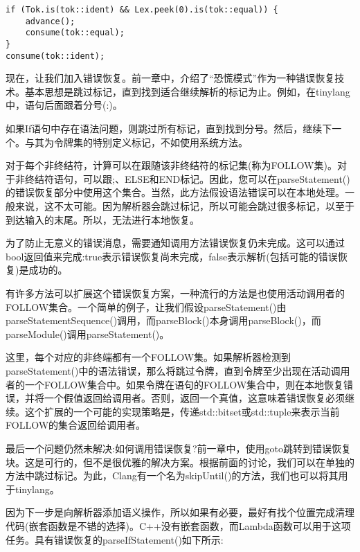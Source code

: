 \begin{lstlisting}[caption={}]
if (Tok.is(tok::ident) && Lex.peek(0).is(tok::equal)) {
	advance();
	consume(tok::equal);
}
consume(tok::ident);
\end{lstlisting}

现在，让我们加入错误恢复。前一章中，介绍了“恐慌模式”作为一种错误恢复技术。基本思想是跳过标记，直到找到适合继续解析的标记为止。例如，在tinylang中，语句后面跟着分号(:)。\par

如果If语句中存在语法问题，则跳过所有标记，直到找到分号。然后，继续下一个。与其为令牌集的特别定义标记，不如使用系统方法。\par

对于每个非终结符，计算可以在跟随该非终结符的标记集(称为FOLLOW集)。对于非终结符语句，可以跟;、ELSE和END标记。因此，您可以在parseStatement()的错误恢复部分中使用这个集合。当然，此方法假设语法错误可以在本地处理。一般来说，这不太可能。因为解析器会跳过标记，所以可能会跳过很多标记，以至于到达输入的末尾。所以，无法进行本地恢复。\par

为了防止无意义的错误消息，需要通知调用方法错误恢复仍未完成。这可以通过bool返回值来完成:true表示错误恢复尚未完成，false表示解析(包括可能的错误恢复)是成功的。\par

有许多方法可以扩展这个错误恢复方案，一种流行的方法是也使用活动调用者的FOLLOW集合。一个简单的例子，让我们假设parseStatement()由parseStatementSequence()调用，而parseBlock()本身调用parseBlock()，而parseModule()调用parseStatement()。\par

这里，每个对应的非终端都有一个FOLLOW集。如果解析器检测到parseStatement()中的语法错误，那么将跳过令牌，直到令牌至少出现在活动调用者的一个FOLLOW集合中。如果令牌在语句的FOLLOW集合中，则在本地恢复错误，并将一个假值返回给调用者。否则，返回一个真值，这意味着错误恢复必须继续。这个扩展的一个可能的实现策略是，传递std::bitset或std::tuple来表示当前FOLLOW的集合返回给调用者。\par

最后一个问题仍然未解决:如何调用错误恢复?前一章中，使用goto跳转到错误恢复块。这是可行的，但不是很优雅的解决方案。根据前面的讨论，我们可以在单独的方法中跳过标记。为此，Clang有一个名为skipUntil()的方法，我们也可以将其用于tinylang。\par

因为下一步是向解析器添加语义操作，所以如果有必要，最好有找个位置完成清理代码(嵌套函数是不错的选择)。C++没有嵌套函数，而Lambda函数可以用于这项任务。具有错误恢复的parseIfStatement()如下所示:\par

